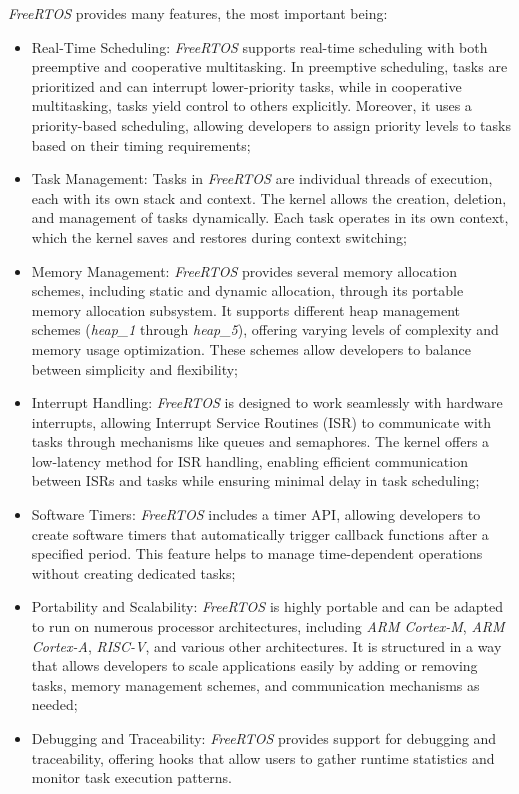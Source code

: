 \textit{FreeRTOS} provides many features, the most important being:
\begin{itemize}
  \item Real-Time Scheduling: \textit{FreeRTOS} supports real-time scheduling with
    both preemptive and cooperative multitasking. In preemptive scheduling, tasks
    are prioritized and can interrupt lower-priority tasks, while in cooperative
    multitasking, tasks yield control to others explicitly. Moreover, it uses a priority-based
    scheduling, allowing developers to assign priority levels to tasks based on
    their timing requirements;

  \item Task Management: Tasks in \textit{FreeRTOS} are individual threads of execution,
    each with its own stack and context. The kernel allows the creation,
    deletion, and management of tasks dynamically. Each task operates in its own
    context, which the kernel saves and restores during context switching;

  \item Memory Management: \textit{FreeRTOS} provides several memory allocation schemes,
    including static and dynamic allocation, through its portable memory allocation
    subsystem. It supports different heap management schemes (\textit{heap\_1}
    through \textit{heap\_5}), offering varying levels of complexity and memory usage
    optimization. These schemes allow developers to balance between simplicity
    and flexibility;

  \item Interrupt Handling: \textit{FreeRTOS} is designed to work seamlessly with
    hardware interrupts, allowing Interrupt Service Routines (ISR) to
    communicate with tasks through mechanisms like queues and semaphores. The kernel
    offers a low-latency method for ISR handling, enabling efficient
    communication between ISRs and tasks while ensuring minimal delay in task
    scheduling;

  \item Software Timers: \textit{FreeRTOS} includes a timer API, allowing
    developers to create software timers that automatically trigger callback
    functions after a specified period. This feature helps to manage time-dependent
    operations without creating dedicated tasks;

  \item Portability and Scalability: \textit{FreeRTOS} is highly portable and can
    be adapted to run on numerous processor architectures, including \textit{ARM
    Cortex-M}, \textit{ARM Cortex-A}, \textit{RISC-V}, and various other
    architectures. It is structured in a way that allows developers to scale applications
    easily by adding or removing tasks, memory management schemes, and communication
    mechanisms as needed;

  \item Debugging and Traceability: \textit{FreeRTOS} provides support for debugging
    and traceability, offering hooks that allow users to gather runtime
    statistics and monitor task execution patterns.
\end{itemize}

